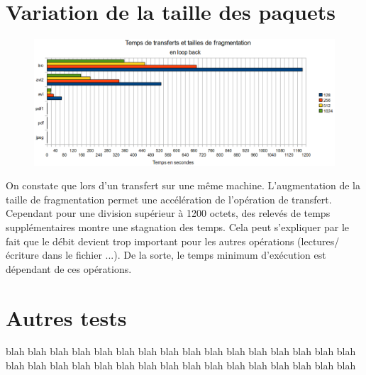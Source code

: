 \section{Variation de la taille des paquets}
\begin{figure}[!h]
\begin{center}
  \includegraphics[scale=0.50]{tfragloc.png}
\end{center}
\end{figure} 
On constate que lors d'un transfert sur une même machine. L'augmentation de la taille de fragmentation permet une accélération de l'opération de transfert. Cependant pour une division supérieur à 1200 octets, des relevés de temps supplémentaires montre une stagnation des temps. Cela peut s'expliquer par le fait que le débit devient trop important pour les autres opérations (lectures/écriture dans le fichier ...). De la sorte, le temps minimum d'exécution est dépendant de ces opérations.

\clearpage{}



\section{Autres tests}
 blah blah blah blah blah blah blah blah blah blah blah blah blah blah blah blah blah blah blah blah blah blah blah blah blah blah blah blah blah blah blah blah

